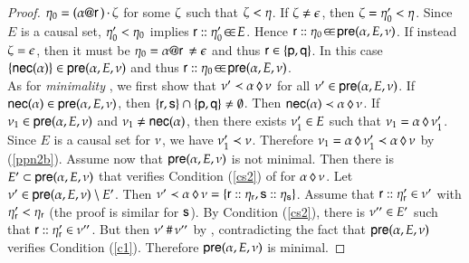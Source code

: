 \begin{proof}
$\eta_0 = (\alpha @ {\sf r}\,)\,{\cdot}\,\zeta$ for some
$\zeta$ such that $\zeta < \eta$. If $\zeta \neq \epsilon$, then
$\zeta = \eta'_0 < \eta$. Since $E$ is a causal set,
$\eta'_0 < \eta_0$ implies ${\sf r}:: \eta'_0\!\in\!\in\!E$.
Hence ${\sf r}:: \eta_0\!\in\!\in\!{\sf pre}(\alpha,E,\nu)$. If
instead $\zeta = \epsilon$, then it must be $\eta_0 =
\alpha @ {\sf r}\,\neq \epsilon$ and thus ${\sf r} \in \{{\sf p},{\sf q}\}$. In this
case $\{{\sf nec}(\alpha)\} \in {\sf pre}(\alpha,E,\nu)$ and thus
${\sf r}:: \eta_0\!\in\!\in\!{\sf pre}(\alpha,E,\nu)$.\\
As for {\em minimality }, we first show that $\nu'\prec
{\alpha}\,\lozenge\,{\nu} $ for all $\nu'\in{\sf pre}(\alpha,E,\nu)$.
If ${\sf nec}(\alpha) \in {\sf pre}(\alpha,E,\nu)$, then $\{{\sf r},{\sf s}\}
\cap \{{\sf p},{\sf q}\} \neq \emptyset$. Then ${\sf nec}(\alpha) \prec
{\alpha}\,\lozenge\,{\nu}$.  If $ \nu_1\in {\sf pre}(\alpha,E,\nu)$ and
$ \nu_1\neq {\sf nec}(\alpha)$, then there exists $\nu'_1 \in E$ such
that $\nu_1 ={\alpha}\,\lozenge\,{\nu'_1}$. Since $E$ is a causal set for
$\nu$, we have $\nu'_1 \prec \nu$. Therefore $\nu_1 =
{\alpha}\,\lozenge\,{\nu'_1}\prec{\alpha}\,\lozenge\,{\nu}$ by
(\ref{ppn2b}). Assume now that
${\sf pre}(\alpha,E,\nu)$ is not minimal.  Then there is
$E'\subset{\sf pre}(\alpha,E,\nu)$ that verifies Condition
(\ref{cs2}) of  for ${\alpha}\,\lozenge\,{\nu}$. Let $\nu'\in
{\sf pre}(\alpha,E,\nu)\setminus E'$. Then $\nu'\prec
{\alpha}\,\lozenge\,{\nu}=\{{\sf r}:: \eta_{{\sf r}},
  {\sf s}:: \eta_{{\sf s}}\}$. Assume that
${\sf r}:: \eta'_{{\sf r}}\in\nu'$ with
$\eta'_{{\sf r}}<\eta_{{\sf r}}$ (the proof is similar for ${\sf s}$).  By
Condition (\ref{cs2}), there is $\nu''\in E'$ such that
${\sf r}:: \eta'_{{\sf r}}\in\nu''$.  But then
$\nu'\,\#\,\nu''$ by , contradicting the fact
that ${\sf pre}(\alpha,E,\nu)$ verifies Condition
(\ref{c1}). Therefore ${\sf pre}(\alpha,E,\nu)$ is minimal.


\end{proof}
